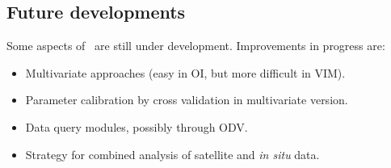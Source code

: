 \subsection{Future developments}

Some aspects of \diva\, are still under development. Improvements in progress are:

\begin{itemize}
\item Multivariate approaches (easy in OI, but more difficult in VIM).
\item Parameter calibration by cross validation in multivariate version.
\item Data query modules, possibly through ODV.
\item Strategy for combined analysis of satellite and {\it in situ} data.
\end{itemize}

